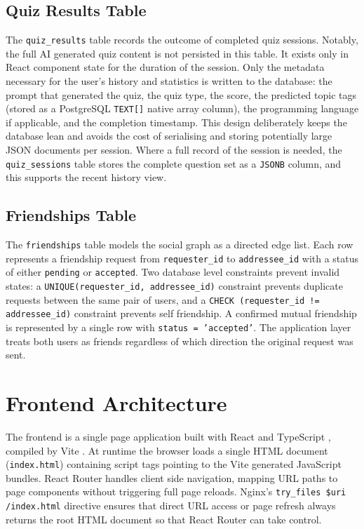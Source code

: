 \subsection{Quiz Results Table}

The \texttt{quiz\_results} table records the outcome of completed quiz
sessions. Notably, the full AI generated quiz content is not persisted
in this table. It exists only in React component state for the duration
of the session. Only the metadata necessary for the user's history and
statistics is written to the database: the prompt that generated the
quiz, the quiz type, the score, the predicted topic tags (stored as a
PostgreSQL \texttt{TEXT[]} native array column), the programming
language if applicable, and the completion timestamp. This design
deliberately keeps the database lean and avoids the cost of serialising
and storing potentially large JSON documents per session. Where a full
record of the session is needed, the \texttt{quiz\_sessions} table
stores the complete question set as a \texttt{JSONB} column, and this
supports the recent history view.

\subsection{Friendships Table}

The \texttt{friendships} table models the social graph as a directed
edge list. Each row represents a friendship request from
\texttt{requester\_id} to \texttt{addressee\_id} with a status of
either \texttt{pending} or \texttt{accepted}. Two database level
constraints prevent invalid states: a \texttt{UNIQUE(requester\_id,
addressee\_id)} constraint prevents duplicate requests between the same
pair of users, and a \texttt{CHECK (requester\_id != addressee\_id)}
constraint prevents self friendship. A confirmed mutual friendship is
represented by a single row with \texttt{status = 'accepted'}. The
application layer treats both users as friends regardless of which
direction the original request was sent.

\section{Frontend Architecture}

The frontend is a single page application built with React
\cite{react2013} and TypeScript \cite{typescript2025}, compiled by Vite
\cite{vite2025}. At runtime the browser loads a single HTML document
(\texttt{index.html}) containing script tags pointing to the Vite
generated JavaScript bundles. React Router handles client side
navigation, mapping URL paths to page components without triggering
full page reloads. Nginx's \texttt{try\_files \$uri /index.html}
directive ensures that direct URL access or page refresh always returns
the root HTML document so that React Router can take control.

